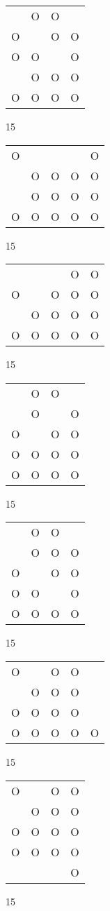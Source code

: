 \begin{tabular}{|m{0.2cm}m{0.2cm}m{0.2cm}m{0.2cm}|}\hline
 &O&O& \\
O& &O&O\\
O&O& &O\\
 &O&O&O\\
O&O&O&O\\
\hline\end{tabular}15
\begin{tabular}{|m{0.2cm}m{0.2cm}m{0.2cm}m{0.2cm}m{0.2cm}|}\hline
O& & & &O\\
 &O&O&O&O\\
 &O&O&O&O\\
O&O&O&O&O\\
\hline\end{tabular}15
\begin{tabular}{|m{0.2cm}m{0.2cm}m{0.2cm}m{0.2cm}m{0.2cm}|}\hline
 & & &O&O\\
O& &O&O&O\\
 &O&O&O&O\\
O&O&O&O&O\\
\hline\end{tabular}15
\begin{tabular}{|m{0.2cm}m{0.2cm}m{0.2cm}m{0.2cm}|}\hline
 &O&O& \\
 &O& &O\\
O& &O&O\\
O&O&O&O\\
O&O&O&O\\
\hline\end{tabular}15
\begin{tabular}{|m{0.2cm}m{0.2cm}m{0.2cm}m{0.2cm}|}\hline
 &O&O& \\
 &O&O&O\\
O& &O&O\\
O&O& &O\\
O&O&O&O\\
\hline\end{tabular}15
\begin{tabular}{|m{0.2cm}m{0.2cm}m{0.2cm}m{0.2cm}m{0.2cm}|}\hline
O& &O&O& \\
 &O&O&O& \\
O&O&O&O& \\
O&O&O&O&O\\
\hline\end{tabular}15
\begin{tabular}{|m{0.2cm}m{0.2cm}m{0.2cm}m{0.2cm}|}\hline
O& &O&O\\
 &O&O&O\\
O&O&O&O\\
O&O&O&O\\
 & & &O\\
\hline\end{tabular}15
